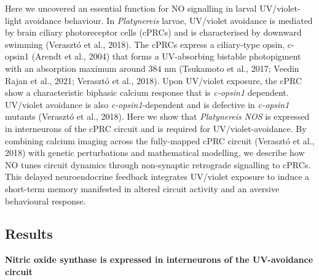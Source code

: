 \documentclass[
  10pt,
  onecolumn]{article}
\begin{document}
Here we uncovered an essential function for NO signalling in larval
UV/violet-light avoidance behaviour. In \emph{Platynereis} larvae,
UV/violet avoidance is mediated by brain ciliary photoreceptor cells
(cPRCs) and is characterised by downward swimming (Verasztó et al.,
2018). The cPRCs express a ciliary-type opsin, c-opsin1 (Arendt et al.,
2004) that forms a UV-absorbing bistable photopigment with an absorption
maximum around 384 nm (Tsukamoto et al., 2017; Veedin Rajan et al.,
2021; Verasztó et al., 2018). Upon UV/violet exposure, the cPRC show a
characteristic biphasic calcium response that is \emph{c-opsin1}
dependent. UV/violet avoidance is also \emph{c-opsin1}-dependent and is
defective in \emph{c-opsin1} mutants (Verasztó et al., 2018). Here we
show that \emph{Platynereis} \emph{NOS} is expressed in interneurons of
the cPRC circuit and is required for UV/violet-avoidance. By combining
calcium imaging across the fully-mapped cPRC circuit (Verasztó et al.,
2018) with genetic perturbations and mathematical modelling, we describe
how NO tunes circuit dynamics through non-synaptic retrograde signalling
to cPRCs. This delayed neuroendocrine feedback integrates UV/violet
exposure to induce a short-term memory manifested in altered circuit
activity and an aversive behavioural response.

\hypertarget{results}{%
\subsection{Results}\label{results}}

\textbf{Nitric oxide synthase is expressed in interneurons of the
UV-avoidance circuit}
\end{document}
